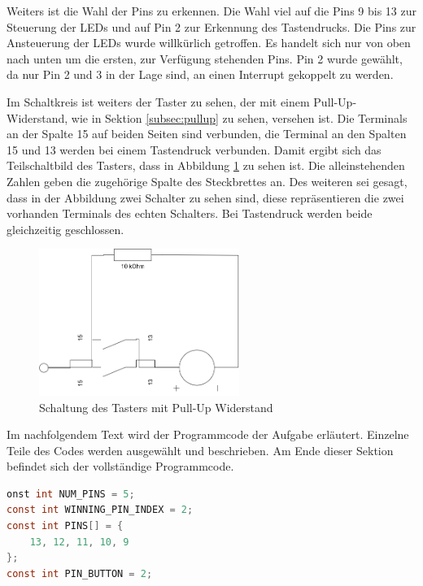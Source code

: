 Weiters ist die Wahl der Pins zu erkennen.
Die Wahl viel auf die Pins 9 bis 13 zur Steuerung der LEDs und auf Pin 2 zur Erkennung des Tastendrucks.
Die Pins zur Ansteuerung der LEDs wurde willkürlich getroffen.
Es handelt sich nur von oben nach unten um die ersten, zur Verfügung stehenden Pins.
Pin 2 wurde gewählt, da nur Pin 2 und 3 in der Lage sind, an einen Interrupt gekoppelt zu werden.

Im Schaltkreis ist weiters der Taster zu sehen, der mit einem Pull-Up-Widerstand, wie in Sektion \ref{subsec:pullup} zu sehen, versehen ist.
Die Terminals an der Spalte 15 auf beiden Seiten sind verbunden, die Terminal an den Spalten 15 und 13 werden bei einem Tastendruck verbunden.
Damit ergibt sich das Teilschaltbild des Tasters, dass in Abbildung \ref{fig:schaltung-taster-pull-up} zu sehen ist.
Die alleinstehenden Zahlen geben die zugehörige Spalte des Steckbrettes an.
Des weiteren sei gesagt, dass in der Abbildung zwei Schalter zu sehen sind, diese repräsentieren die zwei vorhanden Terminals des echten Schalters.
Bei Tastendruck werden beide gleichzeitig geschlossen.

\begin{figure}[h]
    \centering
    \includegraphics[width=0.58\textwidth]{pictures/a2-taster.png}
    \caption{Schaltung des Tasters mit Pull-Up Widerstand}
    \label{fig:schaltung-taster-pull-up}
\end{figure}

Im nachfolgendem Text wird der Programmcode der Aufgabe erläutert.
Einzelne Teile des Codes werden ausgewählt und beschrieben.
Am Ende dieser Sektion befindet sich der vollständige Programmcode.

\begin{lstlisting}[language=C,label={lst:a2-const-pin}, caption={Setzen der Pin-Konstanten}]
onst int NUM_PINS = 5;
const int WINNING_PIN_INDEX = 2;
const int PINS[] = {
	13, 12, 11, 10, 9
};
const int PIN_BUTTON = 2;
\end{lstlisting}


